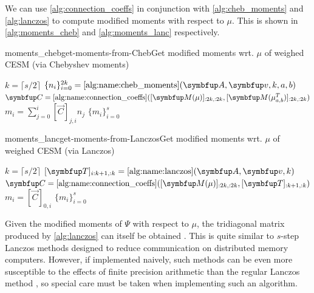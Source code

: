     We can use \cref{alg:connection_coeffs} in conjunction with \cref{alg:cheb_moments} and \cref{alg:lanczos} to compute modified moments with respect to \( \mu \).
    This is shown in \cref{alg:moments_cheb} and \cref{alg:moments_lanc} respectively.

    \begin{labelalgorithm}[H]{moments_cheb}{get-moments-from-Cheb}{Get modified moments wrt. \( \mu \) of weighed CESM (via Chebyshev moments)}
    \begin{algorithmic}[1]
        \State \( k = \lceil s/2 \rceil \)
        \State \( \{ n_i \}_{i=0}^{2k} = \text{\ref{alg:name:cheb_moments}}(\vec{A},\vec{v}, k,a,b)  \)
        \State \( \vec{C} = \text{\ref{alg:name:connection_coeffs}}([\vec{M}(\mu)]_{:2k,:2k},[\vec{M}(\mu_{a,b}^T)]_{:2k,:2k}) \)
            \State \( m_i = \sum_{j=0}^{i} [\vec{C}]_{j,i} n_j \)
        \EndFor
        \State \Return \( \{ m_i \}_{i=0}^{s} \)
    \EndProcedure
    \end{algorithmic}
    \end{labelalgorithm}


    \begin{labelalgorithm}[H]{moments_lanc}{get-moments-from-Lanczos}{Get modified moments wrt. \( \mu \) of weighed CESM (via Lanczos)}
    \begin{algorithmic}[1]
        \State \( k = \lceil s/2 \rceil \)
        \State \( [\vec{T}]_{i:k+1,:k} = \text{\ref{alg:name:lanczos}}(\vec{A},\vec{v}, k)  \)
        \State \( \vec{C} = \text{\ref{alg:name:connection_coeffs}}([\vec{M}(\mu)]_{:2k,:2k},[\vec{T}]_{:k+1,:k}) \)
            \State \( m_i = [\vec{C}]_{0,i} \)
        \EndFor
        \State \Return \( \{ m_i \}_{i=0}^{s} \)
    \EndProcedure
    \end{algorithmic}
    \end{labelalgorithm}
    
    \begin{remark}
    Given the modified moments of \( \Psi \) with respect to \( \mu \), the tridiagonal matrix produced by \cref{alg:lanczos} can itself be obtained \cite{sack_donovan_71}.
    This is quite similar to \( s \)-step Lanczos methods designed to reduce communication on distributed memory computers.
    However, if implemented naively, such methods can be even more susceptible to the effects of finite precision arithmetic than the regular Lanczos method \cite{carson_demmel_15,carson_20}, so special care must be taken when implementing such an algorithm.
    \end{remark}


